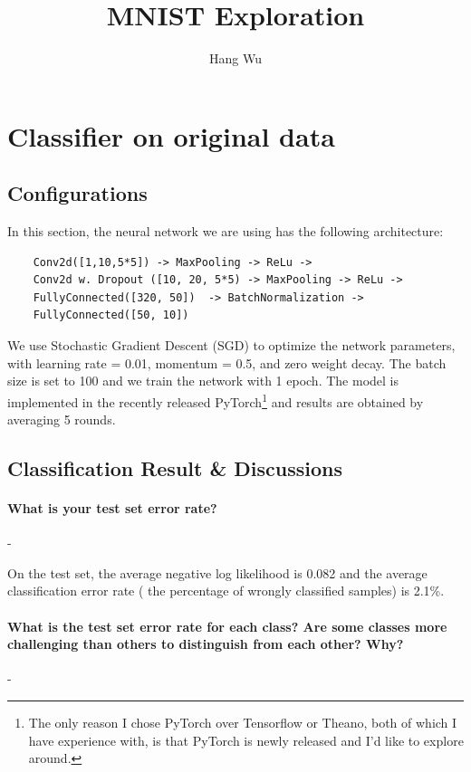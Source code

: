 \documentclass[11pt]{article}
\begin{document}
\title{MNIST Exploration}
\author{Hang Wu}
\date{}
\maketitle

\section{Classifier on original data}

\subsection{Configurations}
In this section, the neural network we are using has the following architecture:
\begin{verbatim}
    Conv2d([1,10,5*5]) -> MaxPooling -> ReLu ->
    Conv2d w. Dropout ([10, 20, 5*5) -> MaxPooling -> ReLu ->
    FullyConnected([320, 50])  -> BatchNormalization -> 
    FullyConnected([50, 10])
\end{verbatim}

We use Stochastic Gradient Descent (SGD) to optimize  the network parameters, with learning rate = 0.01, momentum = 0.5, and zero weight decay. The batch size is set to 100 and we train the network with 1 epoch. The model is implemented in the recently released PyTorch\footnote{The only reason I chose PyTorch over Tensorflow or Theano, both of which I have experience with, is that PyTorch is newly released and I'd like to explore around.} and results are obtained by averaging 5 rounds.

\subsection{Classification Result \& Discussions}
\paragraph{What is your test set error rate?} -

On the test set, the average negative log likelihood is 0.082 and the average classification error rate ( the percentage of wrongly classified samples) is 2.1\%.

\paragraph{What is the test set error rate for each class? Are some classes more challenging than others to distinguish from each other? Why?} -
\end{document}
